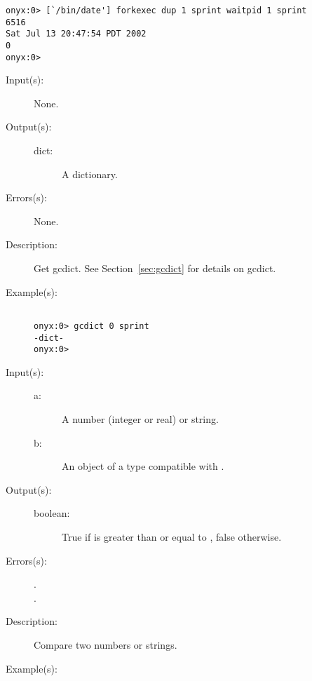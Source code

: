 \begin{description}
\begin{description}
\begin{verbatim}
onyx:0> [`/bin/date'] forkexec dup 1 sprint waitpid 1 sprint
6516
Sat Jul 13 20:47:54 PDT 2002
0
onyx:0>
		\end{verbatim}
	\end{description}
\label{systemdict:gcdict}
\item[{\onyxop{--}{gcdict}{dict}}: ]
	\begin{description}\item[]
	\item[Input(s): ] None.
	\item[Output(s): ]
		\begin{description}\item[]
		\item[dict: ]
			A dictionary.
		\end{description}
	\item[Errors(s): ] None.
	\item[Description: ]
		Get gcdict.  See Section~\ref{sec:gcdict} for details on
		gcdict.
	\item[Example(s): ]\begin{verbatim}

onyx:0> gcdict 0 sprint
-dict-
onyx:0>
		\end{verbatim}
	\end{description}
\label{systemdict:ge}
\item[{\onyxop{a b}{ge}{boolean}}: ]
	\begin{description}\item[]
	\item[Input(s): ]
		\begin{description}\item[]
		\item[a: ]
			A number (integer or real) or string.
		\item[b: ]
			An object of a type compatible with .
		\end{description}
	\item[Output(s): ]
		\begin{description}\item[]
		\item[boolean: ]
			True if  is greater than or equal to ,
			false otherwise.
		\end{description}
	\item[Errors(s): ]
		\begin{description}\item[]
		\item[.]
		\item[.]
		\end{description}
	\item[Description: ]
		Compare two numbers or strings.
	\item[Example(s): ]\begin{verbatim}


\end{verbatim}
\end{description}
\end{description}
